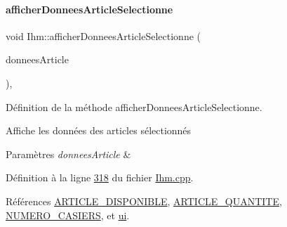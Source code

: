 \paragraph{\texorpdfstring{afficher\+Donnees\+Article\+Selectionne}{afficherDonneesArticleSelectionne}\hspace{0.1cm}{\footnotesize\ttfamily [2/2]}}
{\footnotesize\ttfamily void Ihm\+::afficher\+Donnees\+Article\+Selectionne (\begin{DoxyParamCaption}\item[{Q\+Vector$<$ Q\+String\+List $>$}]{donnees\+Article }\end{DoxyParamCaption})\hspace{0.3cm}{\ttfamily [private]}, {\ttfamily [slot]}}



Définition de la méthode afficher\+Donnees\+Article\+Selectionne. 

Affiche les données des articles sélectionnés 
\begin{DoxyParams}{Paramètres}
{\em donnees\+Article} & \\
\hline
\end{DoxyParams}


Définition à la ligne \hyperlink{_ihm_8cpp_source_l00318}{318} du fichier \hyperlink{_ihm_8cpp_source}{Ihm.\+cpp}.



Références \hyperlink{_ihm_8h_source_l00037}{A\+R\+T\+I\+C\+L\+E\+\_\+\+D\+I\+S\+P\+O\+N\+I\+B\+LE}, \hyperlink{_ihm_8h_source_l00036}{A\+R\+T\+I\+C\+L\+E\+\_\+\+Q\+U\+A\+N\+T\+I\+TE}, \hyperlink{_ihm_8h_source_l00038}{N\+U\+M\+E\+R\+O\+\_\+\+C\+A\+S\+I\+E\+RS}, et \hyperlink{_ihm_8h_source_l00099}{ui}.


